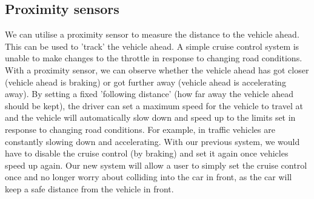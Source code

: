 \documentclass[12pt]{article}
\numberwithin{equation}{section}
\begin{document}
\subsection{Proximity sensors}
We can utilise a proximity sensor to measure the distance to the vehicle ahead. This can be used to 'track' the vehicle ahead. A simple cruise control system is unable to make changes to the throttle in response to changing road conditions. With a proximity sensor, we can observe whether the vehicle ahead has got closer (vehicle ahead is braking) or got further away (vehicle ahead is accelerating away). By setting a fixed 'following distance' (how far away the vehicle ahead should be kept), the driver can set a maximum speed for the vehicle to travel at and the vehicle will automatically slow down and speed up to the limits set in response to changing road conditions. For example, in traffic vehicles are constantly slowing down and accelerating. With our previous system, we would have to disable the cruise control (by braking) and set it again once vehicles speed up again. Our new system will allow a user to simply set the cruise control once and no longer worry about colliding into the car in front, as the car will keep a safe distance from the vehicle in front.
\end{document}
